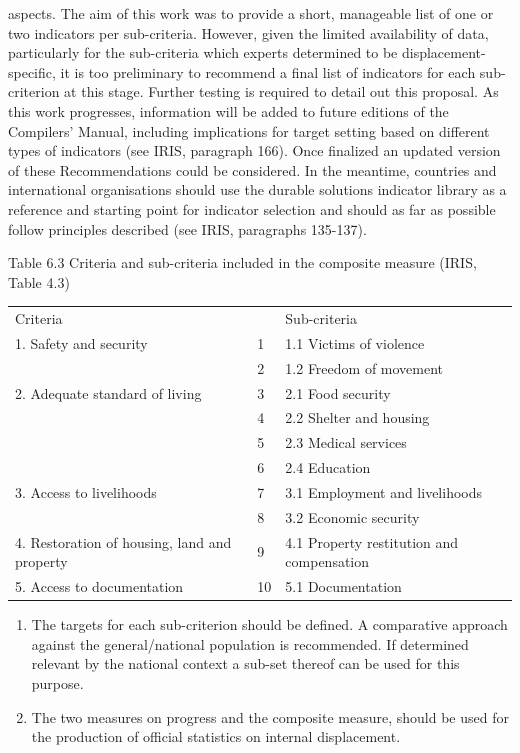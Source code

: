 \documentclass[
]{article}
\begin{document}
\begin{enumerate}
  aspects. The aim of this work was to provide a short, manageable
  list of one or two indicators per sub-criteria. However, given the
  limited availability of data, particularly for the sub-criteria
  which experts determined to be displacement-specific, it is too
  preliminary to recommend a final list of indicators for each
  sub-criterion at this stage. Further testing is required to detail
  out this proposal. As this work progresses, information will be
  added to future editions of the Compilers' Manual, including
  implications for target setting based on different types of
  indicators (see IRIS, paragraph 166). Once finalized an updated
  version of these Recommendations could be considered. In the
  meantime, countries and international organisations should use the
  durable solutions indicator library as a reference and starting
  point for indicator selection and should as far as possible follow
  principles described (see IRIS, paragraphs 135-137).
\end{enumerate}

Table 6.3 Criteria and sub-criteria included in the composite measure
(IRIS, Table 4.3)

\begin{longtable}[]{@{}lll@{}}
\toprule
\endhead
Criteria & & Sub-criteria\tabularnewline
1. Safety and security & 1 & 1.1 Victims of violence\tabularnewline
& 2 & 1.2 Freedom of movement\tabularnewline
2. Adequate standard of living & 3 & 2.1 Food security\tabularnewline
& 4 & 2.2 Shelter and housing\tabularnewline
& 5 & 2.3 Medical services\tabularnewline
& 6 & 2.4 Education\tabularnewline
3. Access to livelihoods & 7 & 3.1 Employment and livelihoods\tabularnewline
& 8 & 3.2 Economic security\tabularnewline
4. Restoration of housing, land and property & 9 & 4.1 Property restitution and compensation\tabularnewline
5. Access to documentation & 10 & 5.1 Documentation\tabularnewline
\bottomrule
\end{longtable}

\begin{enumerate}
\def\labelenumi{\arabic{enumi}.}
\setcounter{enumi}{439}
\item
  The targets for each sub-criterion should be defined. A comparative
  approach against the general/national population is recommended. If
  determined relevant by the national context a sub-set thereof can be
  used for this purpose.
\item
  The two measures on progress and the composite measure, should be
  used for the production of official statistics on internal
  displacement.
\end{enumerate}
\end{document}
